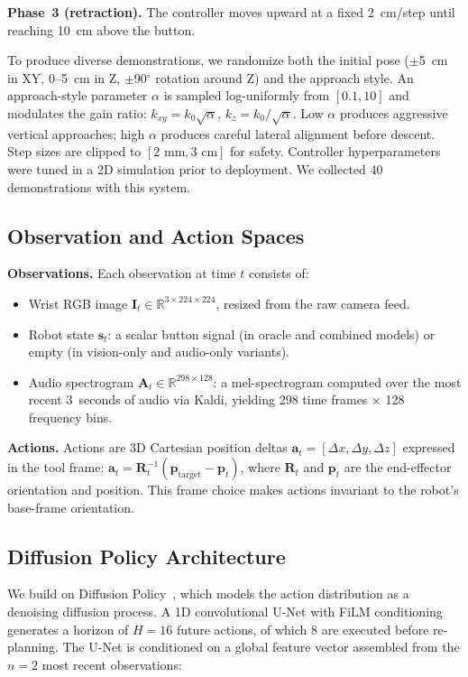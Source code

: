 \documentclass[conference]{IEEEtran}
\begin{document}
\textbf{Phase~3 (retraction).}
The controller moves upward at a fixed 2~cm/step until reaching 10~cm above the button.

To produce diverse demonstrations, we randomize both the initial pose ($\pm$5~cm in XY, 0--5~cm in Z, $\pm$90$^\circ$ rotation around Z) and the approach style.
An approach-style parameter $\alpha$ is sampled log-uniformly from $[0.1, 10]$ and modulates the gain ratio: $k_{xy} = k_0\sqrt{\alpha}$, $k_z = k_0/\sqrt{\alpha}$.
Low $\alpha$ produces aggressive vertical approaches; high $\alpha$ produces careful lateral alignment before descent.
Step sizes are clipped to $[2\text{~mm}, 3\text{~cm}]$ for safety.
Controller hyperparameters were tuned in a 2D simulation prior to deployment.
We collected 40 demonstrations with this system.

\subsection{Observation and Action Spaces}

\textbf{Observations.}
Each observation at time $t$ consists of:
\begin{itemize}
    \item Wrist RGB image $\mathbf{I}_t \in \mathbb{R}^{3 \times 224 \times 224}$, resized from the raw camera feed.
    \item Robot state $\mathbf{s}_t$: a scalar button signal (in oracle and combined models) or empty (in vision-only and audio-only variants).
    \item Audio spectrogram $\mathbf{A}_t \in \mathbb{R}^{298 \times 128}$: a mel-spectrogram computed over the most recent 3~seconds of audio via Kaldi, yielding 298 time frames $\times$ 128 frequency bins.
\end{itemize}

\textbf{Actions.}
Actions are 3D Cartesian position deltas $\mathbf{a}_t = [\Delta x, \Delta y, \Delta z]$ expressed in the tool frame: $\mathbf{a}_t = \mathbf{R}_t^{-1}(\mathbf{p}_{\text{target}} - \mathbf{p}_t)$, where $\mathbf{R}_t$ and $\mathbf{p}_t$ are the end-effector orientation and position.
This frame choice makes actions invariant to the robot's base-frame orientation.

\subsection{Diffusion Policy Architecture}

We build on Diffusion Policy~\cite{chi2023diffusion}, which models the action distribution as a denoising diffusion process.
A 1D convolutional U-Net with FiLM conditioning~\cite{perez2018film} generates a horizon of $H{=}16$ future actions, of which 8 are executed before re-planning.
The U-Net is conditioned on a global feature vector assembled from the $n{=}2$ most recent observations:
\end{document}
